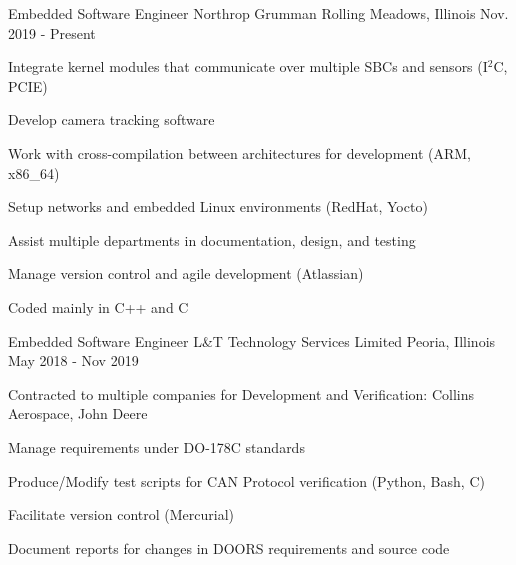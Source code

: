 


\begin{cventries}

\cventry
{Embedded Software Engineer} %
{Northrop Grumman} %
{Rolling Meadows, Illinois} %
{Nov. 2019 - Present} %
{ %
\begin{cvitems}
\item {Integrate kernel modules that communicate over multiple SBCs and sensors (I$^2$C, PCIE)} 
\item {Develop camera tracking software}
\item {Work with cross-compilation between architectures for development (ARM, x86\_64)}
\item {Setup networks and embedded Linux environments (RedHat, Yocto)}
\item {Assist multiple departments in documentation, design, and testing}
\item {Manage version control and agile development (Atlassian)}
\item {Coded mainly in C++ and C}
\end{cvitems}
}

\cventry
{Embedded Software Engineer} %
{L\&T Technology Services Limited} %
{Peoria, Illinois} %
{May 2018 - Nov 2019} %
{ %
\begin{cvitems}
\item {Contracted to multiple companies for Development and Verification: Collins Aerospace, John Deere}
\item {Manage requirements under DO-178C standards}
\item {Produce/Modify test scripts for CAN Protocol verification (Python, Bash, C)}
\item {Facilitate version control (Mercurial) }
\item {Document reports for changes in DOORS requirements and source code}
\end{cvitems}
}


\end{cventries}
